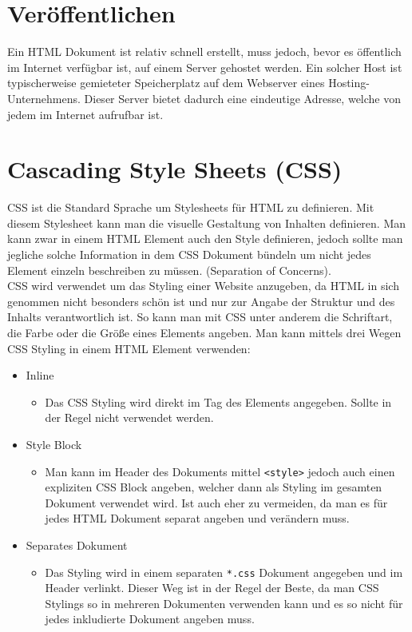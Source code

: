 \documentclass{article}
\begin{document}
	\section{Veröffentlichen}
	Ein HTML Dokument ist relativ schnell erstellt, muss jedoch, bevor es öffentlich im Internet verfügbar ist, auf einem Server gehostet werden. Ein solcher Host ist typischerweise gemieteter Speicherplatz auf dem Webserver eines Hosting-Unternehmens. Dieser Server bietet dadurch eine eindeutige Adresse, welche von jedem im Internet aufrufbar ist.
	\section{Cascading Style Sheets (CSS)}
	CSS ist die Standard Sprache um Stylesheets für HTML zu definieren. Mit diesem Stylesheet kann man die visuelle Gestaltung von Inhalten definieren. Man kann zwar in einem HTML Element auch den Style definieren, jedoch sollte man jegliche solche Information in dem CSS Dokument bündeln um nicht jedes Element einzeln beschreiben zu müssen. (Separation of Concerns). \\
	CSS wird verwendet um das Styling einer Website anzugeben, da HTML in sich genommen nicht besonders schön ist und nur zur Angabe der Struktur und des Inhalts verantwortlich ist. So kann man mit CSS unter anderem die Schriftart, die Farbe oder die Größe eines Elements angeben. Man kann mittels drei Wegen CSS Styling in einem HTML Element verwenden:
	\begin{itemize}
		\item{Inline}
		\begin{itemize}
			\item{Das CSS Styling wird direkt im Tag des Elements angegeben. Sollte in der Regel nicht verwendet werden.}
		\end{itemize}
		\item{Style Block}
		\begin{itemize}
			\item{Man kann im Header des Dokuments mittel \texttt{<style>} jedoch auch einen expliziten CSS Block angeben, welcher dann als Styling im gesamten Dokument verwendet wird. Ist auch eher zu vermeiden, da man es für jedes HTML Dokument separat angeben und verändern muss.}
		\end{itemize}
		\item{Separates Dokument}
		\begin{itemize}
			\item{Das Styling wird in einem separaten \texttt{*.css} Dokument angegeben und im Header verlinkt. Dieser Weg ist in der Regel der Beste, da man CSS Stylings so in mehreren Dokumenten verwenden kann und es so nicht für jedes inkludierte Dokument angeben muss.}
		\end{itemize}
	\end{itemize}
\end{document}
